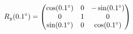 \documentclass[preview]{standalone}
\begin{document}
\begin{align*}
\special{dvisvgm:raw <g id='unique000'>}R_y(0.1^\circ) = \begin{pmatrix} \cos(0.1^\circ) & 0 & -\sin(0.1^\circ) \\ 0 & 1 & 0 \\ \sin(0.1^\circ) & 0 & \cos(0.1^\circ) \end{pmatrix}\special{dvisvgm:raw </g>}
\end{align*}
\end{document}
